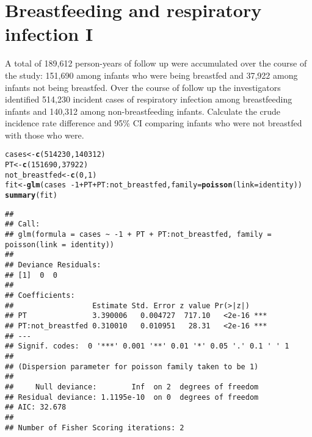 \documentclass[landscape,twocolumn,letterpaper,9pt,reqno]{article}\usepackage[]{graphicx}\usepackage[]{color}
\newcommand{\hlnum}[1]{\textcolor[rgb]{0.686,0.059,0.569}{#1}}%
\newcommand{\hlopt}[1]{\textcolor[rgb]{0,0,0}{#1}}%
\newcommand{\hlstd}[1]{\textcolor[rgb]{0.345,0.345,0.345}{#1}}%
\newcommand{\hlkwb}[1]{\textcolor[rgb]{0.69,0.353,0.396}{#1}}%
\newcommand{\hlkwc}[1]{\textcolor[rgb]{0.333,0.667,0.333}{#1}}%
\newcommand{\hlkwd}[1]{\textcolor[rgb]{0.737,0.353,0.396}{\textbf{#1}}}%
\newenvironment{knitrout}{}{} %
\begin{document}
\section{Breastfeeding and respiratory infection I}

A total of 189,612 person-years of follow up were accumulated over the course of the study: 151,690
among infants who were being breastfed and 37,922 among infants not being breastfed. Over the
course of follow up the investigators identified 514,230 incident cases of respiratory infection among
breastfeeding infants and 140,312 among non-breastfeeding infants. Calculate the crude incidence rate difference and 95\% CI comparing infants who were not breastfed with those who were.

\begin{knitrout}\small
{}\color{fgcolor}
\begin{alltt}
\hlstd{cases} \hlkwb{<-} \hlkwd{c}\hlstd{(}\hlnum{514230}\hlstd{,} \hlnum{140312}\hlstd{)}
\hlstd{PT} \hlkwb{<-} \hlkwd{c}\hlstd{(}\hlnum{151690}\hlstd{,} \hlnum{37922}\hlstd{)}
\hlstd{not_breastfed} \hlkwb{<-} \hlkwd{c}\hlstd{(}\hlnum{0}\hlstd{,} \hlnum{1}\hlstd{)}
\hlstd{fit} \hlkwb{<-} \hlkwd{glm}\hlstd{(cases} \hlopt{~ -}\hlnum{1} \hlopt{+} \hlstd{PT} \hlopt{+} \hlstd{PT}\hlopt{:}\hlstd{not_breastfed,} \hlkwc{family} \hlstd{=} \hlkwd{poisson}\hlstd{(}\hlkwc{link} \hlstd{= identity))}
\hlkwd{summary}\hlstd{(fit)}
\end{alltt}
\begin{verbatim}
## 
## Call:
## glm(formula = cases ~ -1 + PT + PT:not_breastfed, family = poisson(link = identity))
## 
## Deviance Residuals: 
## [1]  0  0
## 
## Coefficients:
##                  Estimate Std. Error z value Pr(>|z|)    
## PT               3.390006   0.004727  717.10   <2e-16 ***
## PT:not_breastfed 0.310010   0.010951   28.31   <2e-16 ***
## ---
## Signif. codes:  0 '***' 0.001 '**' 0.01 '*' 0.05 '.' 0.1 ' ' 1
## 
## (Dispersion parameter for poisson family taken to be 1)
## 
##     Null deviance:        Inf  on 2  degrees of freedom
## Residual deviance: 1.1195e-10  on 0  degrees of freedom
## AIC: 32.678
## 
## Number of Fisher Scoring iterations: 2
\end{verbatim}

\end{knitrout}



	

\clearpage
\end{document}

